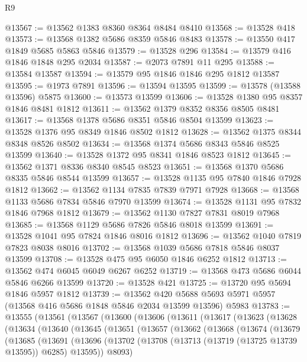 \begin{lexlean}{R9}
\begin{coremodule}
@13567 := @13562 @1383 @8360 @8364 @8484 @8410
@13568 := @13528 @418
@13573 := @13568 @1382 @5686 @8359 @5846 @8483
@13578 := @13550 @417 @1849 @5685 @5863 @5846
@13579 := @13528 @296
@13584 := @13579 @416 @1846 @1848 @295 @2034
@13587 := @2073 @7891 @11 @295
@13588 := @13584 @13587
@13594 := @13579 @95 @1846 @1846 @295 @1812 @13587
@13595 := @1973 @7891
@13596 := @13594 @13595
@13599 := @13578 (@13588 @13596) @5875
@13600 := @13573 @13599
@13606 := @13528 @1380 @95 @8357 @1846 @8481 @1812
@13611 := @13562 @1379 @8352 @8356 @8505 @8481
@13617 := @13568 @1378 @5686 @8351 @5846 @8504 @13599
@13623 := @13528 @1376 @95 @8349 @1846 @8502 @1812
@13628 := @13562 @1375 @8344 @8348 @8526 @8502
@13634 := @13568 @1374 @5686 @8343 @5846 @8525 @13599
@13640 := @13528 @1372 @95 @8341 @1846 @8523 @1812
@13645 := @13562 @1371 @8336 @8340 @8545 @8523
@13651 := @13568 @1370 @5686 @8335 @5846 @8544 @13599
@13657 := @13528 @1135 @95 @7840 @1846 @7928 @1812
@13662 := @13562 @1134 @7835 @7839 @7971 @7928
@13668 := @13568 @1133 @5686 @7834 @5846 @7970 @13599
@13674 := @13528 @1131 @95 @7832 @1846 @7968 @1812
@13679 := @13562 @1130 @7827 @7831 @8019 @7968
@13685 := @13568 @1129 @5686 @7826 @5846 @8018 @13599
@13691 := @13528 @1041 @95 @7824 @1846 @8016 @1812
@13696 := @13562 @1040 @7819 @7823 @8038 @8016
@13702 := @13568 @1039 @5686 @7818 @5846 @8037 @13599
@13708 := @13528 @475 @95 @6050 @1846 @6252 @1812
@13713 := @13562 @474 @6045 @6049 @6267 @6252
@13719 := @13568 @473 @5686 @6044 @5846 @6266 @13599
@13720 := @13528 @421
@13725 := @13720 @95 @5694 @1846 @5957 @1812
@13739 := @13562
    @420
    @5688
    @5693
    @5971
    @5957
    (@13568 @416 @5686 @1848 @5846 @2034 @13599 @13596)
    @5983
@13783 := @13555
    (@13561
      (@13567
        (@13600
          (@13606
            (@13611
              (@13617
                (@13623
                  (@13628
                    (@13634
                      (@13640
                        (@13645
                          (@13651
                            (@13657
                              (@13662
                                (@13668
                                  (@13674
                                    (@13679
                                      (@13685
                                        (@13691
                                          (@13696
                                            (@13702
                                              (@13708
                                                (@13713 (@13719 (@13725 @13739 @13595)) @6285)
                                                @13595))
                                            @8093)

\end{coremodule}
\end{lexlean}
